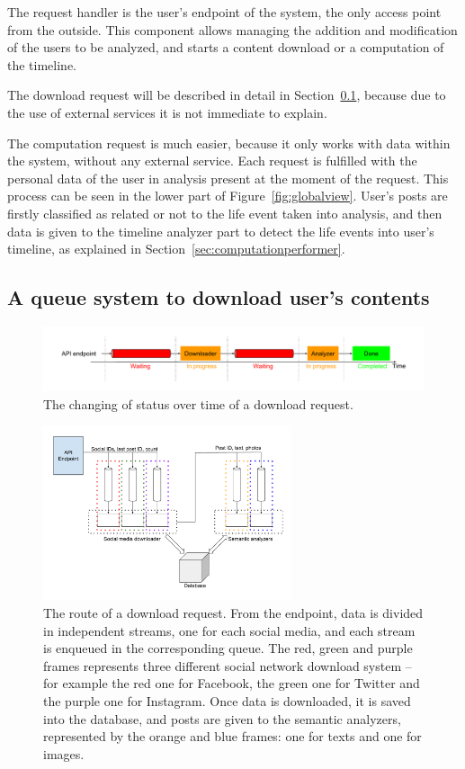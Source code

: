 The request handler is the user's endpoint of the system, the only access point from the outside. This component allows managing the addition and modification of the users to be analyzed, and starts a content download or a computation of the timeline.

The download request will be described in detail in Section~\ref{sec:downloadqueues}, because due to the use of external services it is not immediate to explain.

The computation request is much easier, because it only works with data within the system, without any external service. Each request is fulfilled with the personal data of the user in analysis present at the moment of the request. This process can be seen in the lower part of Figure~\ref{fig:globalview}. User's posts are firstly classified as related or not to the life event taken into analysis, and then data is given to the timeline analyzer part to detect the life events into user's timeline, as explained in Section~\ref{sec:computationperformer}. 

\subsection{A queue system to download user's contents}
\label{sec:downloadqueues}

\begin{figure}
\centering
\includegraphics[width=%
1\textwidth]{img/DownloadStatuses}
\caption{The changing of status over time of a download request.}
\label{fig:statuses}
\end{figure}

\begin{figure}
\centering
\includegraphics[width=%
0.65\textwidth]{img/Queues}
\caption{The route of a download request. From the endpoint, data is divided in independent streams, one for each social media, and each stream is enqueued in the corresponding queue. The red, green and purple frames represents three different social network download system -- for example the red one for Facebook, the green one for Twitter and the purple one for Instagram. Once data is downloaded, it is saved into the database, and posts are given to the semantic analyzers, represented by the orange and blue frames: one for texts and one for images.}
\label{fig:queues}
\end{figure}


